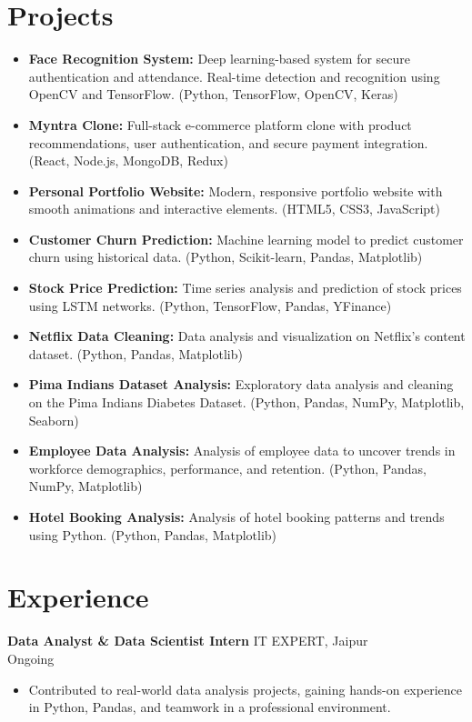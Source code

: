 \documentclass[11pt,a4paper]{article}
\begin{document}
\section*{Projects}
\begin{itemize}[leftmargin=*]
    \item \textbf{Face Recognition System:} Deep learning-based system for secure authentication and attendance. Real-time detection and recognition using OpenCV and TensorFlow. (Python, TensorFlow, OpenCV, Keras)
    \item \textbf{Myntra Clone:} Full-stack e-commerce platform clone with product recommendations, user authentication, and secure payment integration. (React, Node.js, MongoDB, Redux)
    \item \textbf{Personal Portfolio Website:} Modern, responsive portfolio website with smooth animations and interactive elements. (HTML5, CSS3, JavaScript)
    \item \textbf{Customer Churn Prediction:} Machine learning model to predict customer churn using historical data. (Python, Scikit-learn, Pandas, Matplotlib)
    \item \textbf{Stock Price Prediction:} Time series analysis and prediction of stock prices using LSTM networks. (Python, TensorFlow, Pandas, YFinance)
    \item \textbf{Netflix Data Cleaning:} Data analysis and visualization on Netflix's content dataset. (Python, Pandas, Matplotlib)
    \item \textbf{Pima Indians Dataset Analysis:} Exploratory data analysis and cleaning on the Pima Indians Diabetes Dataset. (Python, Pandas, NumPy, Matplotlib, Seaborn)
    \item \textbf{Employee Data Analysis:} Analysis of employee data to uncover trends in workforce demographics, performance, and retention. (Python, Pandas, NumPy, Matplotlib)
    \item \textbf{Hotel Booking Analysis:} Analysis of hotel booking patterns and trends using Python. (Python, Pandas, Matplotlib)
\end{itemize}

\section*{Experience}
\textbf{Data Analyst \& Data Scientist Intern} \hfill IT EXPERT, Jaipur \\Ongoing
\begin{itemize}[leftmargin=*]
    \item Contributed to real-world data analysis projects, gaining hands-on experience in Python, Pandas, and teamwork in a professional environment.
\end{itemize}
\end{document}
